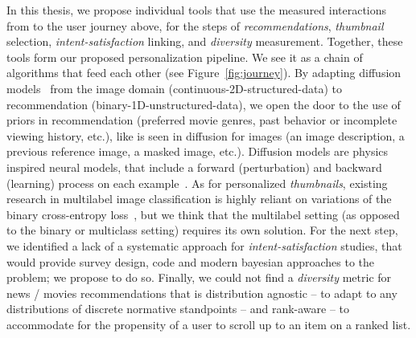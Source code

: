 
In this thesis, we propose individual tools that use the measured interactions from to the user journey above, for the steps of \emph{recommendations}, \emph{thumbnail} selection, \emph{intent-satisfaction} linking, and \emph{diversity} measurement. 
Together, these tools form our proposed personalization pipeline. We see it as a chain of algorithms that feed each other (see Figure~\ref{fig:journey}).
By adapting diffusion models~\cite{jascha} from the image domain (continuous-2D-structured-data) to recommendation (binary-1D-unstructured-data), we open the door to the use of priors in recommendation (preferred movie genres, past behavior or incomplete viewing history, etc.), like is seen in diffusion for images (an image description, a previous reference image, a masked image, etc.). Diffusion models are physics inspired neural models, that include a forward (perturbation) and backward (learning) process on each example~\cite{jascha}. As for personalized \emph{thumbnails}, existing research in multilabel image classification is highly reliant on variations of the binary cross-entropy loss~\cite{fisher}, but we think that the multilabel setting (as opposed to the binary or multiclass setting) requires its own solution. For the next step, we identified a lack of a systematic approach for \emph{intent-satisfaction} studies, that would provide survey design, code and modern bayesian approaches to the problem; we propose to do so. Finally, we could not find a \emph{diversity} metric for news / movies recommendations that is distribution agnostic -- to adapt to any distributions of discrete normative standpoints -- and rank-aware -- to accommodate for the propensity of a user to scroll up to an item on a ranked list.


